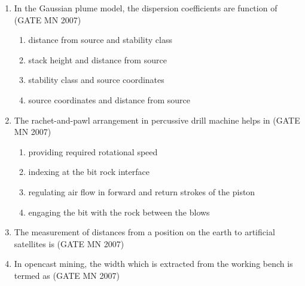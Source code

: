 \documentclass[journal]{IEEEtran}
\begin{document}
\begin{enumerate}
\item In the Gaussian plume model, the dispersion coefficients are function of
	\hfill (GATE MN 2007)
\begin{enumerate}
		
    \item distance from source and stability class
    \item stack height and distance from source
    \item stability class and source coordinates
    \item source coordinates and distance from source
	    
\end{enumerate}


\item The rachet-and-pawl arrangement in percussive drill machine helps in
	\hfill (GATE MN 2007)
\begin{enumerate}
		
		
    \item providing required rotational speed
    \item indexing at the bit rock interface
    \item regulating air flow in forward and return strokes of the piston
    \item engaging the bit with the rock between the blows
	    
\end{enumerate}


\item The measurement of distances from a position on the earth to artificial satellites is
	\hfill (GATE MN 2007)
\begin{enumerate}
		
\end{enumerate}


\item In opencast mining, the width which is extracted from the working bench is termed as
	\hfill (GATE MN 2007)
\begin{enumerate}
\end{enumerate}



\end{enumerate}
\end{document}

